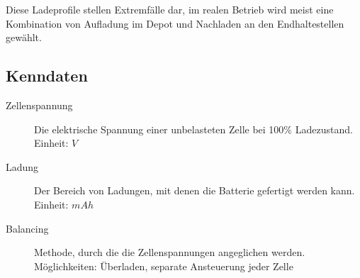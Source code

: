 Diese Ladeprofile stellen Extremfälle dar, im realen Betrieb wird meist eine Kombination von Aufladung im Depot und Nachladen an den Endhaltestellen gewählt. 

\subsection{Kenndaten}

\begin{description}
	\item[Zellenspannung] Die elektrische Spannung einer unbelasteten Zelle bei 100\% Ladezustand.\\
	Einheit: $V$
	\item[Ladung] Der Bereich von Ladungen, mit denen die Batterie gefertigt werden kann.\\
	Einheit: $mAh$
	\item[Balancing] Methode, durch die die Zellenspannungen angeglichen werden.\\
	Möglichkeiten: Überladen, separate Ansteuerung jeder Zelle
\end{description}

